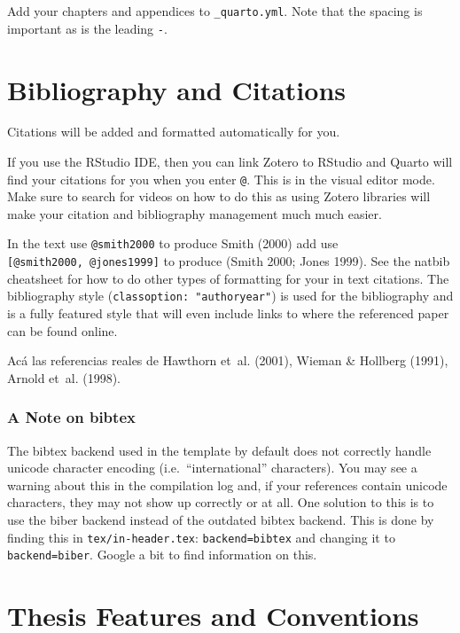 \documentclass[
  letterpaper,
  12pt,
  oneside,
  spanish,
  doublespacing,
  headsepline,
  parskip]{MastersDoctoralThesis}
\begin{document}
Add your chapters and appendices to \texttt{\_quarto.yml}. Note that the
spacing is important as is the leading \texttt{-}.

\hypertarget{bibliography-and-citations}{%
\section{Bibliography and Citations}\label{bibliography-and-citations}}

Citations will be added and formatted automatically for you.

If you use the RStudio IDE, then you can link Zotero to RStudio and
Quarto will find your citations for you when you enter \texttt{@}. This
is in the visual editor mode. Make sure to search for videos on how to
do this as using Zotero libraries will make your citation and
bibliography management much much easier.

In the text use \texttt{@smith2000} to produce Smith (2000) add use
\texttt{{[}@smith2000,\ @jones1999{]}} to produce (Smith 2000; Jones
1999). See the natbib cheatsheet for how to do other types of formatting
for your in text citations. The bibliography style
(\texttt{classoption:\ "authoryear"}) is used for the bibliography and
is a fully featured style that will even include links to where the
referenced paper can be found online.

Acá las referencias reales de Hawthorn et~al. (2001), Wieman \& Hollberg
(1991), Arnold et~al. (1998).

\hypertarget{a-note-on-bibtex}{%
\subsubsection{A Note on bibtex}\label{a-note-on-bibtex}}

The bibtex backend used in the template by default does not correctly
handle unicode character encoding (i.e.~``international'' characters).
You may see a warning about this in the compilation log and, if your
references contain unicode characters, they may not show up correctly or
at all. One solution to this is to use the biber backend instead of the
outdated bibtex backend. This is done by finding this in
\texttt{tex/in-header.tex}: \texttt{backend=bibtex} and changing it to
\texttt{backend=biber}. Google a bit to find information on this.

\hypertarget{sec-ThesisConventions}{%
\section{Thesis Features and Conventions}\label{sec-ThesisConventions}}
\end{document}
